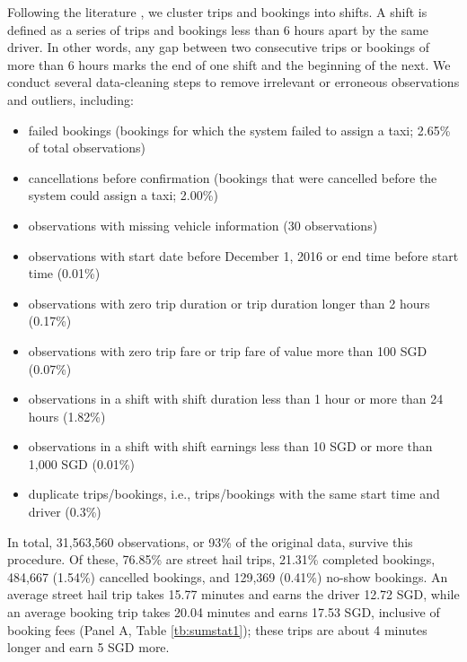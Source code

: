 \documentclass[reviewmode]{AEA}
\begin{document}
Following the literature \citep{farber2015you,agarwal2015singaporean,martin2017quit,chen2015dynamic}, we cluster trips and bookings into shifts. A shift is defined as a series of trips and bookings less than 6 hours apart by the same driver. In other words, any gap between two consecutive trips or bookings of more than 6 hours marks the end of one shift and the beginning of the next. We conduct several data-cleaning steps to remove irrelevant or erroneous observations and outliers, including:
\begin{itemize}[noitemsep,nolistsep]
	\item failed bookings (bookings for which the system failed to assign a taxi; 2.65\% of total observations)
	\item cancellations before confirmation (bookings that were cancelled before the system could assign a taxi; 2.00\%)
	\item observations with missing vehicle information (30 observations)
	\item observations with start date before December 1, 2016 or end time before start time (0.01\%)
	\item observations with zero trip duration or trip duration longer than 2 hours (0.17\%)
	\item observations with zero trip fare or trip fare of value more than 100 SGD (0.07\%)%
	\item observations in a shift with shift duration less than 1 hour or more than 24 hours (1.82\%)
	\item observations in a shift with shift earnings less than 10 SGD or more than 1,000 SGD (0.01\%)%
	\item duplicate trips/bookings, i.e., trips/bookings with the same start time and driver (0.3\%)
\end{itemize}

In total, 31,563,560 observations, or 93\% of the original data, survive this procedure. Of these, 76.85\% are street hail trips, 21.31\% completed bookings, 484,667 (1.54\%) cancelled bookings, and 129,369 (0.41\%) no-show bookings. An average street hail trip takes 15.77 minutes and earns the driver 12.72 SGD, while an average  booking trip takes 20.04 minutes and earns 17.53 SGD, inclusive of booking fees (Panel A, Table \ref{tb:sumstat1}); these trips are about 4 minutes longer and earn 5 SGD more.
\end{document}
